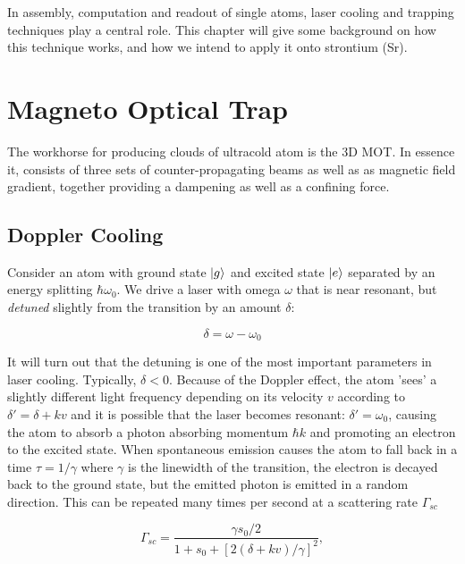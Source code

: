 In assembly, computation and readout of single atoms, laser cooling and trapping techniques play a central role. This chapter will give some background on how this technique works, and how we intend to apply it onto strontium (Sr).

\section{Magneto Optical Trap}

The workhorse for producing clouds of ultracold atom is the 3D \ac{MOT}. In essence it, consists of three sets of counter-propagating beams as well as as magnetic field gradient, together providing a dampening as well as a confining force. 

\subsection{Doppler Cooling}

Consider an atom with ground state $\lvert g\rangle$ and excited state $\lvert e\rangle$ separated by an energy splitting $\hbar \omega_0$. We drive a laser with omega $\omega$ that is near resonant, but \emph{detuned} slightly from the transition by an amount $\delta$:

\begin{equation}\label{detuning}
	\delta = \omega - \omega_0
\end{equation}

It will turn out that the detuning is one of the most important parameters in laser cooling. Typically, $\delta <0$. Because of the Doppler effect, the atom 'sees' a slightly different light frequency depending on its velocity $v$ according to $\delta'=\delta+kv$ and it is possible that the laser becomes resonant: $\delta' = \omega_0$, causing the atom to absorb a photon absorbing momentum $\hbar k$ and promoting an electron to the excited state. When spontaneous emission causes the atom to fall back in a time $\tau = 1/\gamma$ where $\gamma$ is the linewidth of the transition, the electron is decayed back to the ground state, but the emitted photon is emitted in a random direction. This can be repeated many times per second at a scattering rate $\Gamma_{sc}$ \cite{Metcalf1999}

\begin{equation}\label{eq:ScatteringFrequency}
	\Gamma_{sc} = \frac{ \gamma s_0 /2}{1+s_0+\left[2(\delta+ k v)/\gamma\right]^2},
\end{equation}

